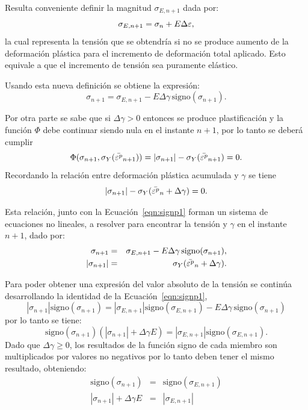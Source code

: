Resulta conveniente definir la magnitud $\sigma_{E,n+1}$ dada por:
%
\begin{equation}
\sigma_{E,n+1} = \sigma_n + E \Delta \varepsilon,
\end{equation}
%
la cual representa la tensión que se obtendría si no se produce aumento de la deformación plástica para el incremento de deformación total aplicado. Esto equivale a que el incremento de tensión sea puramente elástico. %


Usando esta nueva definición se obtiene la expresión:
%
\begin{equation}\label{eqn:signp1}
\sigma_{n+1} = \sigma_{E,n+1} - E  \Delta \gamma \, \text{signo} (\sigma_{n+1}).
\end{equation}

Por otra parte se sabe que si $\Delta \gamma >0$ entonces se produce plastificación y la función $\Phi$ debe continuar siendo nula en el instante $n+1$,
por lo tanto se deberá cumplir
\begin{equation}
\Phi(\sigma_{n+1},\sigma_Y(\bar{ \varepsilon^p}_{n+1} ) )  = |\sigma_{n+1}|- \sigma_Y ( \bar{ \varepsilon^p}_{n+1} ) = 0 .
\end{equation}
%
Recordando la relación entre deformación plástica acumulada y $\gamma$ se tiene
\begin{equation}
|\sigma_{n+1}|- \sigma_Y ( \bar{ \varepsilon^p}_{n} + \Delta \gamma ) = 0 .
\end{equation}

Esta relación, junto con la Ecuación~\eqref{eqn:signp1}  forman un sistema de ecuaciones no lineales, a resolver para encontrar la tensión y $\gamma$ en el instante $n+1$, dado por:
%
\begin{eqnarray}
\sigma_{n+1} &= & \sigma_{E,n+1} - E  \Delta \gamma \, \text{signo} (\sigma_{n+1}), \\
|\sigma_{n+1}| &=& \sigma_Y ( \bar{ \varepsilon^p}_{n} + \Delta \gamma ) \label{eqn:phisigm}.
\end{eqnarray}

Para poder obtener una expresión del valor absoluto de la tensión se continúa desarrollando la identidad de la Ecuación~\eqref{eqn:signp1},
%
\begin{equation}
|\sigma_{n+1}|\text{signo}(\sigma_{n+1}) = |\sigma_{E,n+1}|\text{signo}(\sigma_{E,n+1}) - E  \Delta \gamma \, \text{signo} (\sigma_{n+1})
\end{equation}
por lo tanto se tiene:
\begin{equation}
\text{signo}(\sigma_{n+1}) \left(  |\sigma_{n+1}| + \Delta \gamma E \right) = |\sigma_{E,n+1}|\text{signo}(\sigma_{E,n+1}).
\end{equation}
%
Dado que $\Delta \gamma \geq 0$, los resultados de la función signo de cada miembro son multiplicados por valores no negativos por lo tanto deben tener el mismo resultado, obteniendo:
%
\begin{eqnarray}
\text{signo}(\sigma_{n+1}) &=& \text{signo}(\sigma_{E,n+1})\\
|\sigma_{n+1}| + \Delta \gamma E  & = & |\sigma_{E,n+1}|
\end{eqnarray}

